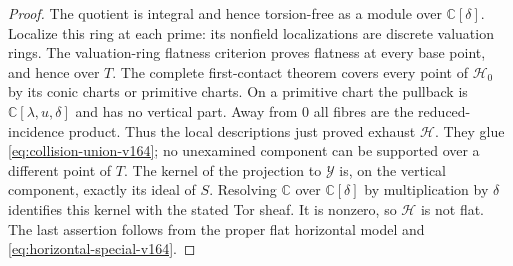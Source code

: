 \documentclass[11pt,reqno]{amsart}
\numberwithin{equation}{section}
\theoremstyle{definition}\newtheorem{definition}[theorem]{Definition}
\theoremstyle{remark}\newtheorem{remark}[theorem]{Remark}
\newcommand{\C}{\mathbb C}\newcommand{\Q}{\mathbb Q}
\begin{document}
\begin{proof}
The quotient is integral and hence torsion-free as a module over
$\C[\delta]$. Localize this ring at each prime: its nonfield
localizations are discrete valuation rings. The valuation-ring
flatness criterion \cite[Tag~0539]{Stacks164} proves flatness at
every base point, and hence over $T$.
The complete first-contact theorem covers every point of
$\mathcal H_0$ by its conic charts or primitive charts. On a primitive
chart the pullback is $\C[\lambda,u,\delta]$ and has no vertical
part. Away from $0$ all fibres are the reduced-incidence product.
Thus the local descriptions just proved exhaust $\mathcal H$.
They glue \eqref{eq:collision-union-v164}; no unexamined component
can be supported over a different point of $T$. The kernel of the
projection to $\mathcal Y$ is, on the vertical component, exactly
its ideal of $S$. Resolving $\C$ over $\C[\delta]$ by multiplication
by $\delta$ identifies this kernel with the stated Tor sheaf.
It is nonzero, so $\mathcal H$ is not flat. The last assertion follows
from the proper flat horizontal model and
\eqref{eq:horizontal-special-v164}.
\end{proof}
\end{document}
